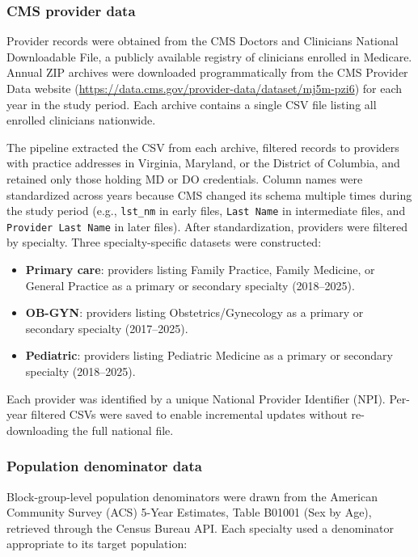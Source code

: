 \documentclass{CUP-JNL-DAP}%
\begin{document}
\subsubsection{CMS provider data}

Provider records were obtained from the CMS Doctors and Clinicians National Downloadable File, a publicly available registry of clinicians enrolled in Medicare. Annual ZIP archives were downloaded programmatically from the CMS Provider Data website (\url{https://data.cms.gov/provider-data/dataset/mj5m-pzi6}) for each year in the study period. Each archive contains a single CSV file listing all enrolled clinicians nationwide.

The pipeline extracted the CSV from each archive, filtered records to providers with practice addresses in Virginia, Maryland, or the District of Columbia, and retained only those holding MD or DO credentials. Column names were standardized across years because CMS changed its schema multiple times during the study period (e.g., \texttt{lst\_nm} in early files, \texttt{Last Name} in intermediate files, and \texttt{Provider Last Name} in later files). After standardization, providers were filtered by specialty. Three specialty-specific datasets were constructed:

\begin{itemize}
\item \textbf{Primary care}: providers listing Family Practice, Family Medicine, or General Practice as a primary or secondary specialty (2018--2025).
\item \textbf{OB-GYN}: providers listing Obstetrics/Gynecology as a primary or secondary specialty (2017--2025).
\item \textbf{Pediatric}: providers listing Pediatric Medicine as a primary or secondary specialty (2018--2025).
\end{itemize}

Each provider was identified by a unique National Provider Identifier (NPI). Per-year filtered CSVs were saved to enable incremental updates without re-downloading the full national file.

\subsubsection{Population denominator data}

Block-group-level population denominators were drawn from the American Community Survey (ACS) 5-Year Estimates, Table B01001 (Sex by Age), retrieved through the Census Bureau API. Each specialty used a denominator appropriate to its target population:
\end{document}
